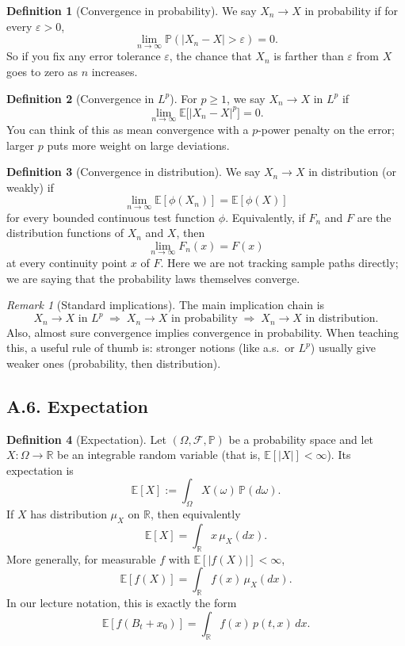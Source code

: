 \documentclass[11pt]{article}
\theoremstyle{definition}
\newtheorem{definition}{Definition}
\theoremstyle{remark}
\newtheorem{remark}{Remark}
\begin{document}
\begin{definition}[Convergence in probability]
We say $X_n\to X$ in probability if for every $\varepsilon>0$,
\[
\lim_{n\to\infty}\mathbb P(|X_n-X|>\varepsilon)=0.
\]
So if you fix any error tolerance $\varepsilon$, the chance that $X_n$ is farther than $\varepsilon$ from $X$ goes to zero as $n$ increases.
\end{definition}

\begin{definition}[Convergence in $L^p$]
For $p\ge1$, we say $X_n\to X$ in $L^p$ if
\[
\lim_{n\to\infty}\mathbb E\bigl[|X_n-X|^p\bigr]=0.
\]
You can think of this as mean convergence with a $p$-power penalty on the error; larger $p$ puts more weight on large deviations.
\end{definition}

\begin{definition}[Convergence in distribution]
We say $X_n\to X$ in distribution (or weakly) if
\[
\lim_{n\to\infty}\mathbb E[\phi(X_n)]=\mathbb E[\phi(X)]
\]
for every bounded continuous test function $\phi$.
Equivalently, if $F_n$ and $F$ are the distribution functions of $X_n$ and $X$, then
\[
\lim_{n\to\infty}F_n(x)=F(x)
\]
at every continuity point $x$ of $F$. Here we are not tracking sample paths directly; we are saying that the probability laws themselves converge.
\end{definition}

\begin{remark}[Standard implications]
The main implication chain is
\[
X_n\to X\text{ in }L^p
\;\Longrightarrow\;
X_n\to X\text{ in probability}
\;\Longrightarrow\;
X_n\to X\text{ in distribution}.
\]
Also, almost sure convergence implies convergence in probability.
When teaching this, a useful rule of thumb is: stronger notions (like a.s.\ or $L^p$) usually give weaker ones (probability, then distribution).
\end{remark}

\subsection*{A.6. Expectation}
\begin{definition}[Expectation]
Let $(\Omega,\mathcal F,\mathbb P)$ be a probability space and let $X:\Omega\to\mathbb R$ be an integrable random variable (that is, $\mathbb E[|X|]<\infty$). Its expectation is
\[
\mathbb E[X]:=\int_{\Omega} X(\omega)\,\mathbb P(d\omega).
\]
If $X$ has distribution $\mu_X$ on $\mathbb R$, then equivalently
\[
\mathbb E[X]=\int_{\mathbb R} x\,\mu_X(dx).
\]
More generally, for measurable $f$ with $\mathbb E[|f(X)|]<\infty$,
\[
\mathbb E[f(X)]=\int_{\mathbb R} f(x)\,\mu_X(dx).
\]
In our lecture notation, this is exactly the form
\[
\mathbb E[f(B_t+x_0)]=\int_{\mathbb R} f(x)\,p(t,x)\,dx.
\]
\end{definition}
\end{document}
